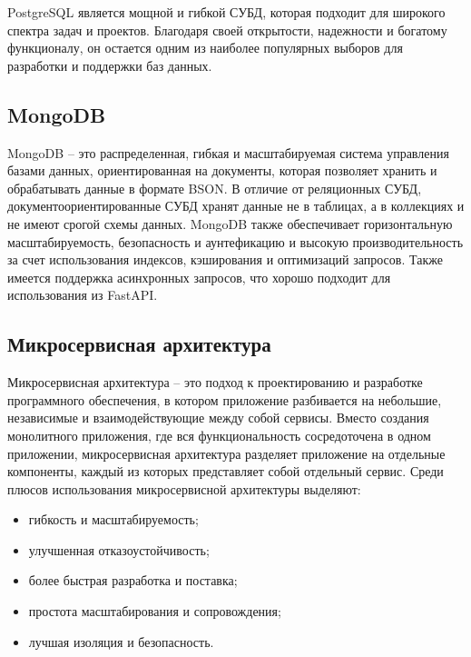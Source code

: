 PostgreSQL является мощной и гибкой СУБД, которая подходит для широкого спектра задач и проектов.
Благодаря своей открытости, надежности и богатому функционалу, он остается одним из наиболее популярных выборов для разработки и поддержки баз данных.


\subsection{MongoDB}\label{subsec:domain:mongodb}
MongoDB -- это распределенная, гибкая и масштабируемая система управления базами данных,
ориентированная на документы, которая позволяет хранить и обрабатывать данные в формате BSON.
В отличие от реляционных СУБД, документоориентированные СУБД хранят данные не в таблицах, а в коллекциях и не имеют срогой схемы данных.
MongoDB также обеспечивает горизонтальную масштабируемость, безопасность и аунтефикацию и
высокую производительность за счет использования индексов, кэширования и оптимизаций запросов.
Также имеется поддержка асинхронных запросов, что хорошо подходит для использования из FastAPI.



\subsection{Микросервисная архитектура}\label{subsec:domain:microservices-arch}
Микросервисная архитектура -- это подход к проектированию и разработке программного обеспечения, в котором приложение разбивается на небольшие, независимые и взаимодействующие между собой сервисы.
Вместо создания монолитного приложения, где вся функциональность сосредоточена в одном приложении, микросервисная архитектура разделяет приложение на отдельные компоненты, каждый из которых представляет собой отдельный сервис.
Среди плюсов использования микросервисной архитектуры выделяют:
\begin{itemize}
    \item гибкость и масштабируемость;
    \item улучшенная отказоустойчивость;
    \item более быстрая разработка и поставка;
    \item простота масштабирования и сопровождения;
    \item лучшая изоляция и безопасность.
\end{itemize}

